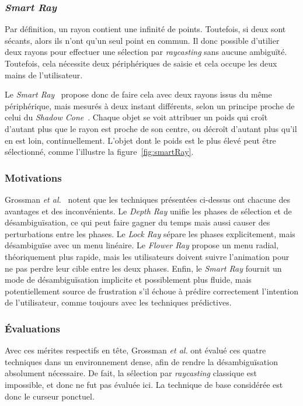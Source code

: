 	\subsubsection{\emph{Smart Ray}}
	Par définition, un rayon contient une infinité de points. Toutefois, si deux sont sécants, alors ils n'ont qu'un seul point en commun. Il donc possible d'utilier deux rayons pour effectuer une sélection par \emph{raycasting} sans aucune ambiguïté. Toutefois, cela nécessite deux périphériques de saisie et cela occupe les deux mains de l'utilisateur.
	
	Le \emph{Smart Ray}~\cite{grossman2006design} propose donc de faire cela avec deux rayons issus du même périphérique, mais mesurés à deux instant différents, selon un principe proche de celui du \emph{Shadow Cone}~\cite{steed20043d}. Chaque objet se voit attribuer un \og poids \fg{} qui croît d'autant plus que le rayon est proche de son centre, ou décroît d'autant plus qu'il en est loin, continuellement. L'objet dont le poids est le plus élevé peut être sélectionné, comme l'illustre la figure~\ref{fig:smartRay}.
	
	\subsubsection{Motivations}
	Grossman \emph{et al.}~\cite{grossman2006design} notent que les techniques présentées ci-dessus ont chacune des avantages et des inconvénients. Le \emph{Depth Ray} unifie les phases de sélection et de désambiguïsation, ce qui peut faire gagner du temps mais aussi causer des perturbations entre les phases. Le \emph{Lock Ray} sépare les phases explicitement, mais désambiguïse avec un menu linéaire. Le \emph{Flower Ray} propose un menu radial, théoriquement plus rapide, mais les utilisateurs doivent suivre l'animation pour ne pas perdre leur cible entre les deux phases. Enfin, le \emph{Smart Ray} fournit un mode de désambiguïsation implicite et possiblement plus fluide, mais potentiellement source de frustration s'il échoue à prédire correctement l'intention de l'utilisateur, comme toujours avec les techniques prédictives.
	
	\subsubsection{Évaluations}
	Avec ces mérites respectifs en tête, Grossman \emph{et al.} ont évalué ces quatre techniques dans un environnement dense, afin de rendre la désambiguïsation absolument nécessaire. De fait, la sélection par \emph{raycasting} classique est impossible, et donc ne fut pas évaluée ici. La technique de base considérée est donc le curseur ponctuel.

